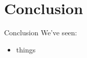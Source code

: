 \section{Conclusion}

\begin{frame}[c]{Conclusion}
    We've seen:
    \begin{itemize}
        \item things
    \end{itemize}
\end{frame}
